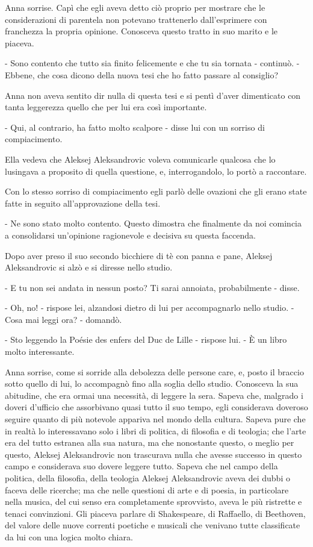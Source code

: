 Anna sorrise. Capì che egli aveva detto ciò proprio per mostrare che le considerazioni di parentela non potevano trattenerlo dall'esprimere con franchezza la propria opinione. Conosceva questo tratto in suo marito e le piaceva. 

- Sono contento che tutto sia finito felicemente e che tu sia tornata - continuò. - Ebbene, che cosa dicono della nuova tesi che ho fatto passare al consiglio? 

Anna non aveva sentito dir nulla di questa tesi e si pentì d'aver dimenticato con tanta leggerezza quello che per lui era così importante. 

- Qui, al contrario, ha fatto molto scalpore - disse lui con un sorriso di compiacimento. 

Ella vedeva che Aleksej Aleksandrovic voleva comunicarle qualcosa che lo lusingava a proposito di quella questione, e, interrogandolo, lo portò a raccontare. 

Con lo stesso sorriso di compiacimento egli parlò delle ovazioni che gli erano state fatte in seguito all'approvazione della tesi. 

- Ne sono stato molto contento. Questo dimostra che finalmente da noi comincia a consolidarsi un'opinione ragionevole e decisiva su questa faccenda. 

Dopo aver preso il suo secondo bicchiere di tè con panna e pane, Aleksej Aleksandrovic si alzò e si diresse nello studio. 

- E tu non sei andata in nessun posto? Ti sarai annoiata, probabilmente - disse. 

- Oh, no! - rispose lei, alzandosi dietro di lui per accompagnarlo nello studio. - Cosa mai leggi ora? - domandò. 

- Sto leggendo la Poésie des enfers del Duc de Lille - rispose lui. - È un libro molto interessante. 

Anna sorrise, come si sorride alla debolezza delle persone care, e, posto il braccio sotto quello di lui, lo accompagnò fino alla soglia dello studio. Conosceva la sua abitudine, che era ormai una necessità, di leggere la sera. Sapeva che, malgrado i doveri d'ufficio che assorbivano quasi tutto il suo tempo, egli considerava doveroso seguire quanto di più notevole appariva nel mondo della cultura. Sapeva pure che in realtà lo interessavano solo i libri di politica, di filosofia e di teologia; che l'arte era del tutto estranea alla sua natura, ma che nonostante questo, o meglio per questo, Aleksej Aleksandrovic non trascurava nulla che avesse successo in questo campo e considerava suo dovere leggere tutto. Sapeva che nel campo della politica, della filosofia, della teologia Aleksej Aleksandrovic aveva dei dubbi o faceva delle ricerche; ma che nelle questioni di arte e di poesia, in particolare nella musica, del cui senso era completamente sprovvisto, aveva le più ristrette e tenaci convinzioni. Gli piaceva parlare di Shakespeare, di Raffaello, di Beethoven, del valore delle nuove correnti poetiche e musicali che venivano tutte classificate da lui con una logica molto chiara. 

